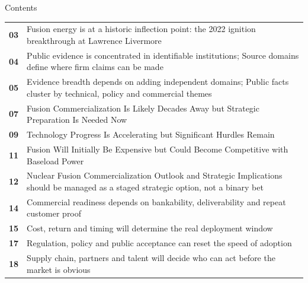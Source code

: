 \documentclass[10pt,a4paper]{article}
\begin{document}
\clearpage
\noindent{}\par\vspace{8pt}
{\sffamily\fontsize{26}{31}\selectfont\color{BONavy} Contents}\par\vspace{10pt}
\begin{minipage}[t]{0.57\linewidth}
\begin{tabularx}{\linewidth}{p{12mm}Y}
\textcolor{BOGreen}{\bfseries 03} & {\footnotesize Fusion energy is at a historic inflection point: the 2022 ignition breakthrough at Lawrence Livermore} \\[4pt]
\textcolor{BOGreen}{\bfseries 04} & {\footnotesize Public evidence is concentrated in identifiable institutions; Source domains define where firm claims can be made} \\[4pt]
\textcolor{BOGreen}{\bfseries 05} & {\footnotesize Evidence breadth depends on adding independent domains; Public facts cluster by technical, policy and commercial themes} \\[4pt]
\textcolor{BOGreen}{\bfseries 07} & {\footnotesize Fusion Commercialization Is Likely Decades Away but Strategic Preparation Is Needed Now} \\[4pt]
\textcolor{BOGreen}{\bfseries 09} & {\footnotesize Technology Progress Is Accelerating but Significant Hurdles Remain} \\[4pt]
\textcolor{BOGreen}{\bfseries 11} & {\footnotesize Fusion Will Initially Be Expensive but Could Become Competitive with Baseload Power} \\[4pt]
\textcolor{BOGreen}{\bfseries 12} & {\footnotesize Nuclear Fusion Commercialization Outlook and Strategic Implications should be managed as a staged strategic option, not a binary bet} \\[4pt]
\textcolor{BOGreen}{\bfseries 14} & {\footnotesize Commercial readiness depends on bankability, deliverability and repeat customer proof} \\[4pt]
\textcolor{BOGreen}{\bfseries 15} & {\footnotesize Cost, return and timing will determine the real deployment window} \\[4pt]
\textcolor{BOGreen}{\bfseries 17} & {\footnotesize Regulation, policy and public acceptance can reset the speed of adoption} \\[4pt]
\textcolor{BOGreen}{\bfseries 18} & {\footnotesize Supply chain, partners and talent will decide who can act before the market is obvious} \\[4pt]

\end{tabularx}
\end{minipage}
\end{document}
